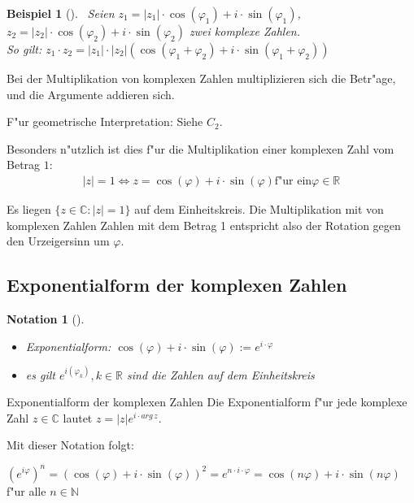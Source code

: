 \documentclass[11pt]{article}
\newtheorem{exa}{Beispiel}[section]
\newtheorem*{notation}{Notation}
\begin{document}
\begin{exa}[] \label{} \
Seien \(z_1=|z_1|\cdot \cos(\varphi_1)+i\cdot \sin(\varphi_1)\), \(z_2=|z_2|\cdot
\cos(\varphi_2)+i\cdot \sin(\varphi_2)\) zwei komplexe Zahlen.\\

So gilt: \(z_1\cdot z_2 = |z_1|\cdot |z_2|(\cos(\varphi_1+\varphi_2)+i\cdot \sin(\varphi_1 +
\varphi_2))\)
\end{exa}

\begin{relation}
Bei der Multiplikation von komplexen Zahlen multiplizieren sich die Betr"age,
und die Argumente addieren sich.
\end{relation}

F"ur geometrische Interpretation: Siehe \(C_2\).

Besonders n"utzlich ist dies f"ur die Multiplikation einer komplexen Zahl vom
Betrag \(1\):
\begin{align*}
|z|=1\iff z=\cos(\varphi)+i\cdot \sin(\varphi) \text{f"ur ein} \varphi \in \mathbb{R}
\end{align*}

\begin{relation}
Es liegen \(\{z\in \mathbb{C} : |z|=1\}\) auf dem Einheitskreis.
Die Multiplikation mit von komplexen Zahlen Zahlen mit dem Betrag 1 entspricht
also der Rotation gegen den Urzeigersinn um \(\varphi\).
\end{relation}

\subsection{Exponentialform der komplexen Zahlen}
\label{sec:orgb4d9f14}
\begin{notation}[] \label{} \
\begin{itemize}
\item Exponentialform: \(\cos(\varphi)+i\cdot \sin(\varphi):=e^{i\cdot \varphi}\)
\item es gilt \(e^{i(\varphi_k)}, k\in\mathbb{R}\) sind die Zahlen auf dem Einheitskreis
\end{itemize}
\end{notation}

\begin{definition}{Exponentialform der komplexen Zahlen}{}
Die Exponentialform f"ur jede komplexe Zahl \(z\in\mathbb{C}\) lautet \(z=|z|e^{i\cdot arg\,z}\).
\end{definition}

Mit dieser Notation folgt:
\begin{relation}
\((e^{i\varphi})^n=(\cos(\varphi)+i\cdot\sin(\varphi))^2=e^{n\cdot i\cdot
 \varphi}=\cos(n\varphi)+i\cdot\sin(n\varphi)\) f"ur alle \(n\in\mathbb{N}\)
\end{relation}
\end{document}
